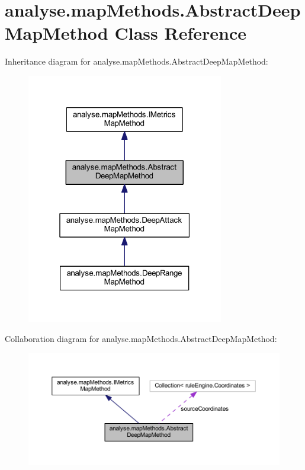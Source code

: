 \hypertarget{classanalyse_1_1map_methods_1_1_abstract_deep_map_method}{}\section{analyse.\+map\+Methods.\+Abstract\+Deep\+Map\+Method Class Reference}
\label{classanalyse_1_1map_methods_1_1_abstract_deep_map_method}


Inheritance diagram for analyse.\+map\+Methods.\+Abstract\+Deep\+Map\+Method\+:
\nopagebreak
\begin{figure}[H]
\begin{center}
\leavevmode
\includegraphics[width=244pt]{classanalyse_1_1map_methods_1_1_abstract_deep_map_method__inherit__graph}
\end{center}
\end{figure}


Collaboration diagram for analyse.\+map\+Methods.\+Abstract\+Deep\+Map\+Method\+:
\nopagebreak
\begin{figure}[H]
\begin{center}
\leavevmode
\includegraphics[width=350pt]{classanalyse_1_1map_methods_1_1_abstract_deep_map_method__coll__graph}
\end{center}
\end{figure}
